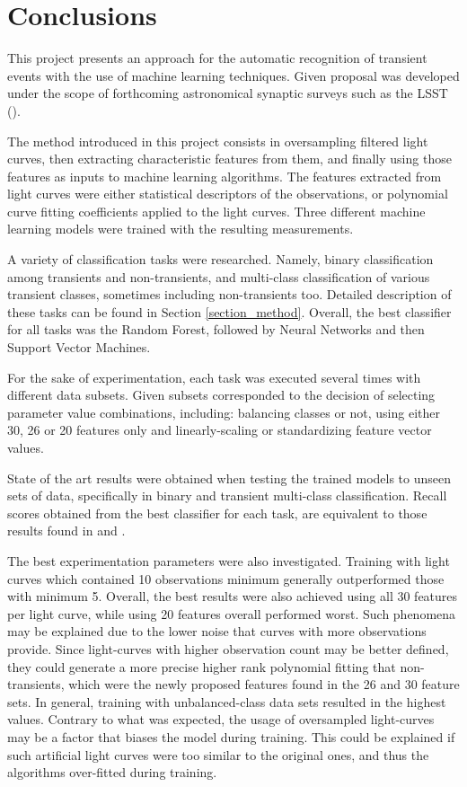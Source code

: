 \documentclass[a4paper,fleqn,usenatbib]{mnras}
\begin{document}

\section{Conclusions}

This project presents an approach for the automatic recognition of transient events with the use of machine learning techniques. Given proposal was developed under the scope of forthcoming astronomical synaptic surveys such as the LSST (\cite{0805.2366}). 

The method introduced in this project consists in oversampling filtered light curves, then extracting characteristic features from them, and finally using those features as inputs to machine learning algorithms. The features extracted from light curves were either statistical descriptors of the observations, or polynomial curve fitting coefficients applied to the light curves.  
Three different machine learning models were trained with the resulting measurements.

A variety of classification tasks were researched. Namely, binary classification among transients and non-transients, and multi-class classification of various transient classes, sometimes including non-transients too. Detailed description of these tasks can be found in Section \ref{section_method}. 
Overall, the best classifier for all tasks was the Random Forest, followed by Neural Networks and then Support Vector Machines.

For the sake of experimentation, each task was executed several times with different data subsets. Given subsets corresponded to the decision of selecting parameter value combinations, including: balancing classes or not, using either 30, 26 or 20 features only and linearly-scaling or standardizing feature vector values.

State of the art results were obtained when testing the trained models to unseen sets of data, specifically in binary and transient multi-class classification. Recall scores obtained from the best classifier for each task, are equivalent to those results found in \cite{1401.3211} and \cite{1601.03931}.


The best experimentation parameters were also investigated. 
Training with light curves which contained 10 observations minimum generally outperformed those with minimum 5. Overall, the best results were also achieved using all 30 features per light curve, while using 20 features overall performed worst. Such phenomena may be explained due to the lower noise that curves with more observations provide.
Since light-curves with higher observation count may be better defined, they could generate a more precise higher rank polynomial fitting that non-transients, which were the newly proposed features found in the 26 and 30 feature sets.
In general, training with unbalanced-class data sets resulted in the highest values. Contrary to what was expected, the usage of oversampled light-curves may be a factor that biases the model during training. This could be explained if such artificial light curves were too similar to the original ones, and thus the algorithms over-fitted during training.
\end{document}
